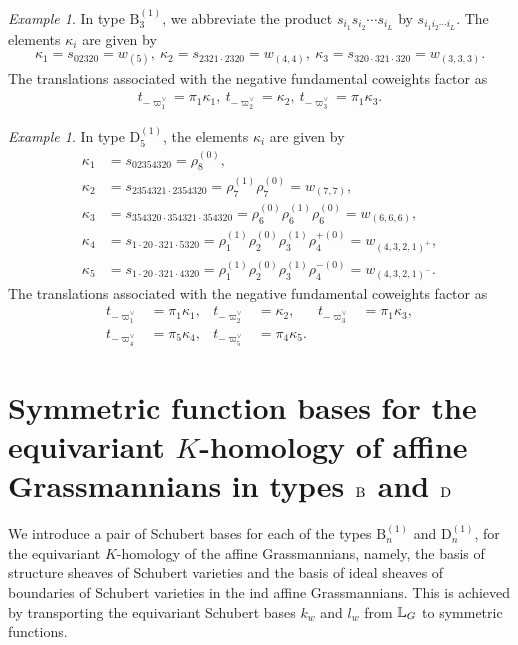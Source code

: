 \documentclass[a4paper]{amsart}
\theoremstyle{remark}
\newtheorem{example}[thm]{Example}
\numberwithin{equation}{section}
\begin{document}
\begin{example}
In type $\mathrm{B}_3^{(1)}$, we abbreviate the product
$s_{i_1}s_{i_2}\cdots s_{i_L}$ by $s_{i_1i_2\cdots i_L}$.
The elements $\kappa_i$ are given by
\begin{align*}
\kappa_1= s_{02320}
     = w_{(5)},~
\kappa_2= s_{2321\cdot 2320}
     = w_{(4,4)},~\kappa_3= s_{320\cdot 321\cdot 320}
     = w_{(3,3,3)}.
\end{align*}
The translations associated with the negative fundamental coweights
factor as
\begin{align*}
t_{-\varpi_1^\lor}= \pi_1\kappa_1,~
t_{-\varpi_2^\lor}= \kappa_2,~
t_{-\varpi_3^\lor} = \pi_1\kappa_3.
\end{align*}
\end{example}



\begin{example}
In type $\mathrm{D}_5^{(1)}$, the elements $\kappa_i$ are given by
\begin{align*}
\kappa_1
    &= s_{02354320}
     = \rho_8^{(0)},\\
\kappa_2
    &= s_{2354321\cdot 2354320}
     =\rho_7^{(1)}
       \rho_7^{(0)}= w_{(7,7)},\\
\kappa_3
    &= s_{354320\cdot 354321\cdot 354320}
     =\rho_6^{(0)}\rho_6^{(1)}
       \rho_6^{(0)}= w_{(6,6,6)},\\
\kappa_4
    &= s_{1\cdot 20\cdot 321\cdot 5320}
     = \rho_1^{(1)}\rho_2^{(0)}
       \rho_3^{(1)}\rho_4^{+(0)}
     = w_{(4,3,2,1)^+},\\
\kappa_5
    &= s_{1\cdot 20\cdot 321\cdot 4320}
     = \rho_1^{(1)}\rho_2^{(0)}
       \rho_3^{(1)}\rho_4^{-(0)}
     = w_{(4,3,2,1)^-}.
\end{align*}
The translations associated with the negative fundamental coweights
factor as
\begin{align*}
t_{-\varpi_1^\lor} &= \pi_1\kappa_1,
&
t_{-\varpi_2^\lor} &= \kappa_2,
&
t_{-\varpi_3^\lor} &= \pi_1\kappa_3,\\
t_{-\varpi_4^\lor} &= \pi_5\kappa_4,
&
t_{-\varpi_5^\lor} &= \pi_4\kappa_5.
\end{align*}
\end{example}






\section{Symmetric function bases for the equivariant $K$-homology of affine Grassmannians in types $\mathrm{B}_{}$ and $\mathrm{D}_{}$}\label{S:sym_fun_rea}
We introduce a pair of Schubert bases for each of the types $\mathrm{B}_n^{(1)}$ and $\mathrm{D}_n^{(1)}$, for the equivariant $K$-homology of the affine Grassmannians, namely, the basis of structure sheaves of Schubert varieties and the basis of ideal sheaves of boundaries of Schubert varieties in the ind affine Grassmannians.
This is achieved by transporting the equivariant Schubert bases $k_w$ and $l_w$ from $\mathbb{L}_G$ to symmetric functions.
\end{document}
